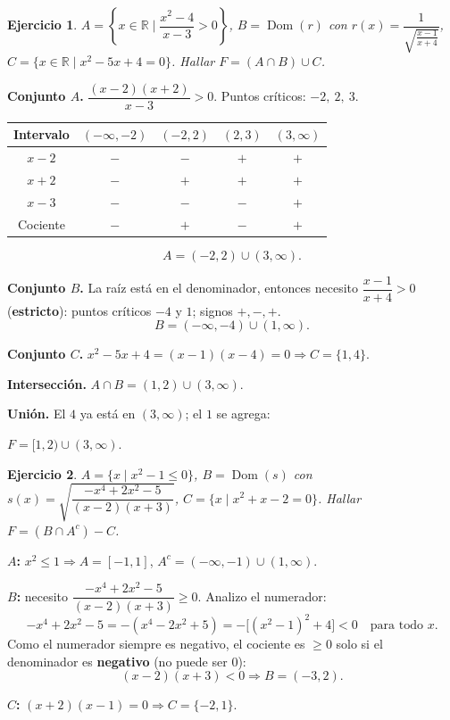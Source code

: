 \documentclass[11pt,a4paper]{article}
\theoremstyle{ej}
\newtheorem{ejercicio}{Ejercicio}[section]
\newcommand{\R}{\mathbb{R}}
\newcommand{\dom}{\operatorname{Dom}}
\begin{document}
\begin{ejercicio}
$A=\left\{x\in\R\;\Big|\;\dfrac{x^2-4}{x-3}>0\right\}$, \quad $B=\dom(r)$ con $r(x)=\dfrac1{\sqrt{\frac{x-1}{x+4}}}$, \quad
$C=\{x\in\R\mid x^2-5x+4=0\}$. Hallar $F=(A\cap B)\cup C$.
\end{ejercicio}

\textbf{Conjunto $A$.} $\dfrac{(x-2)(x+2)}{x-3}>0$. Puntos críticos: $-2,\ 2,\ 3$.
\begin{center}
\begin{tabular}{c|cccc}
Intervalo & $(-\infty,-2)$ & $(-2,2)$ & $(2,3)$ & $(3,\infty)$\\ \hline
$x-2$ & $-$ & $-$ & $+$ & $+$\\
$x+2$ & $-$ & $+$ & $+$ & $+$\\
$x-3$ & $-$ & $-$ & $-$ & $+$\\ \hline
Cociente & $-$ & $+$ & $-$ & $+$
\end{tabular}
\end{center}
\[ A=(-2,2)\cup(3,\infty). \]

\textbf{Conjunto $B$.} La raíz está en el denominador, entonces necesito $\dfrac{x-1}{x+4}>0$ (\textbf{estricto}):
puntos críticos $-4$ y $1$; signos $+,-,+$.
\[ B=(-\infty,-4)\cup(1,\infty). \]

\textbf{Conjunto $C$.} $x^2-5x+4=(x-1)(x-4)=0\Rightarrow C=\{1,4\}$.

\textbf{Intersección.} $A\cap B=(1,2)\cup(3,\infty)$.

\textbf{Unión.} El $4$ ya está en $(3,\infty)$; el $1$ se agrega:
\begin{respuesta}
$F=[1,2)\cup(3,\infty).$
\end{respuesta}

\begin{ejercicio}
$A=\{x\mid x^2-1\le0\}$, \; $B=\dom(s)$ con $s(x)=\sqrt{\dfrac{-x^4+2x^2-5}{(x-2)(x+3)}}$,
\; $C=\{x\mid x^2+x-2=0\}$. Hallar $F=(B\cap A^c)-C$.
\end{ejercicio}

\textbf{$A$:} $x^2\le1\Rightarrow A=[-1,1]$, \; $A^c=(-\infty,-1)\cup(1,\infty)$.

\textbf{$B$:} necesito $\dfrac{-x^4+2x^2-5}{(x-2)(x+3)}\ge0$. Analizo el numerador:
\[ -x^4+2x^2-5=-\left(x^4-2x^2+5\right)=-\big[(x^2-1)^2+4\big]<0\quad\text{para todo }x. \]
Como el numerador siempre es negativo, el cociente es $\ge0$ solo si el denominador es \textbf{negativo}
(no puede ser $0$):
\[ (x-2)(x+3)<0\Rightarrow B=(-3,2). \]

\textbf{$C$:} $(x+2)(x-1)=0\Rightarrow C=\{-2,1\}$.
\end{document}
